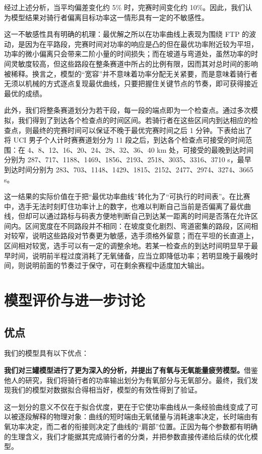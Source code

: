 \documentclass[11pt,a4paper]{ctexart}
\begin{document}
经过上述分析，当平均偏差变化约 5\% 时，完赛时间变化约 10\%。因此，我们认为模型结果对骑行者偏离目标功率这一情形具有一定的不敏感性。

这一不敏感性具有明确的机理：最优解之所以在功率曲线上表现为围绕 FTP 的波动，是因为在平路段，完赛时间对功率的响应是凸的但在最优功率附近较为平坦，功率的微小偏离只会带来二阶小量的时间损失；而在坡道与弯道处，虽然功率的时间灵敏度较高，但这些路段在整条赛道中所占的比例有限，因而其对总时间的影响被稀释。换言之，模型的“宽容”并不意味着功率分配无关紧要，而是意味着骑行者无须以机械的方式逐点复现最优曲线，只要把握住关键节点的节奏，即可获得接近最优的成绩。

此外，我们将整条赛道划分为若干段，每一段的端点即为一个检查点。通过多次模拟，我们得到了到达各个检查点的时间区间。若骑行者在这些区间内到达相应的检查点，则最终的完赛时间可以保证不晚于最优完赛时间之后 1 分钟。下表给出了将 UCI 男子个人计时赛赛道划分为 11 段之后，到达各个检查点可接受的时间范围：在 4、8、12、16、20、24、28、32、36、40 km 处，可接受的最晚到达时间分别为 287、717、1188、1469、1856、2193、2518、3035、3316、3710 s，最早到达时间分别为 283、703、1148、1429、1815、2152、2477、2974、3274、3665 s。

这一结果的实际价值在于把“最优功率曲线”转化为了“可执行的时间表”。在比赛中，选手无法时刻盯住功率计上的数字，也难以判断自己当前是否偏离了最优曲线，但却可以通过路标与码表方便地判断自己到达某一距离的时间是否落在允许区间内。区间宽度在不同路段并不相同：在坡度变化剧烈、弯道密集的路段，区间相对较窄，说明这些路段对节奏更为敏感，选手须格外留意；而在平坦的长直道上，区间相对较宽，选手可以有一定的调整余地。若某一检查点的到达时间明显早于最早时间，说明前半程过度消耗了无氧储备，应当立即降低功率；若明显晚于最晚时间，则说明前面的节奏过于保守，可在剩余赛程中适度加大输出。

\section{模型评价与进一步讨论}

\subsection{优点}

我们的模型具有以下优点：

\textbf{我们对三罐模型进行了更为深入的分析，并提出了有氧与无氧能量疲劳模型。}借鉴他人的研究，我们将骑行者的功率输出划分为有氧部分与无氧部分。最终，我们发现我们的模型对数据拟合得相当好，模型的有效性得到了验证。

这一划分的意义不仅在于拟合优度，更在于它使功率曲线从一条经验曲线变成了可以被逐段解释的物理对象：曲线的短时端由无氧储量与消耗速率决定，长时端由有氧功率决定，而二者的衔接则决定了曲线的“肩部”位置。正因为每个参数都有明确的生理含义，我们才能据其完成骑行者的分类，并把参数直接传递给后续的优化模型。
\end{document}
